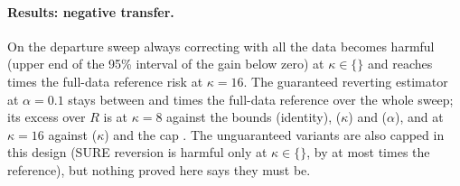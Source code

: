 \documentclass[10pt,a4paper]{article}
\theoremstyle{plain}
\theoremstyle{definition}
\theoremstyle{remark}
\begin{document}
\paragraph{Results: negative transfer.}
On the departure sweep always correcting with all the data becomes harmful (upper end of the 95\% interval of the gain below zero) at $\kappa\in\{$\HarmfulAlwaysDep$\}$ and reaches \DSixteenAlwaysRatio{} times the full-data reference risk at $\kappa=16$. The guaranteed reverting estimator at $\alpha=0.1$ stays between \DZeroRevTenRatio{} and \DEightRevTenRatio{} times the full-data reference over the whole sweep; its excess over $R$ is \DEightRevTenExcess{} at $\kappa=8$ against the bounds \DEightRevTenBoundTight{} (identity), \DEightRevTenBoundKappa{} ($\kappa$) and \DEightRevTenBoundAlpha{} ($\alpha$), and \DSixteenRevTenExcess{} at $\kappa=16$ against \DSixteenRevTenBoundKappa{} ($\kappa$) and the cap \UniformCapTen. The unguaranteed variants are also capped in this design (SURE reversion is harmful only at $\kappa\in\{$\HarmfulSureDep$\}$, by at most \DFourSureRatio{} times the reference), but nothing proved here says they must be.
\end{document}

